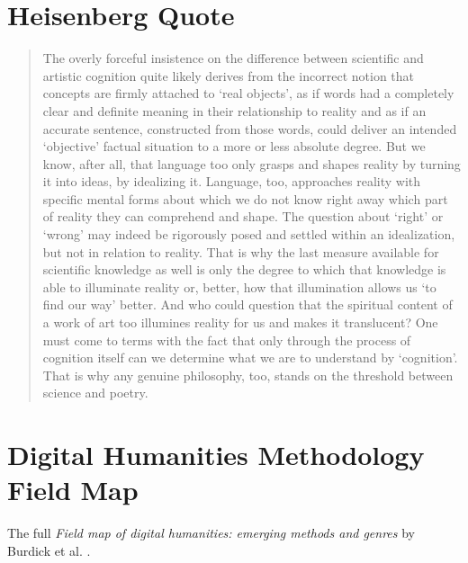 \section{Heisenberg Quote}
\label{s:heisenberg}

\begin{quotation}
  The overly forceful insistence on the difference between scientific and artistic cognition quite likely derives from the incorrect notion that concepts are firmly attached to `real objects', as if words had a completely clear and definite meaning in their relationship to reality and as if an accurate sentence, constructed from those words, could deliver an intended `objective' factual situation to a more or less absolute degree. But we know, after all, that language too only grasps and shapes reality by turning it into ideas, by idealizing it. Language, too, approaches reality with specific mental forms about which we do not know right away which part of reality they can comprehend and shape. The question about `right' or `wrong' may indeed be rigorously posed and settled within an idealization, but not in relation to reality. That is why the last measure available for scientific knowledge as well is only the degree to which that knowledge is able to illuminate reality or, better, how that illumination allows us `to find our way' better. And who could question that the spiritual content of a work of art too illumines reality for us and makes it translucent? One must come to terms with the fact that only through the process of cognition itself can we determine what we are to understand by `cognition'. That is why any genuine philosophy, too, stands on the threshold between science and poetry. 
\end{quotation}


\section{Digital Humanities Methodology Field Map}
\label{s:dhmap}

The full \textit{Field map of digital humanities: emerging methods and genres} by Burdick et al. \citeyear{Burdick2012}.

